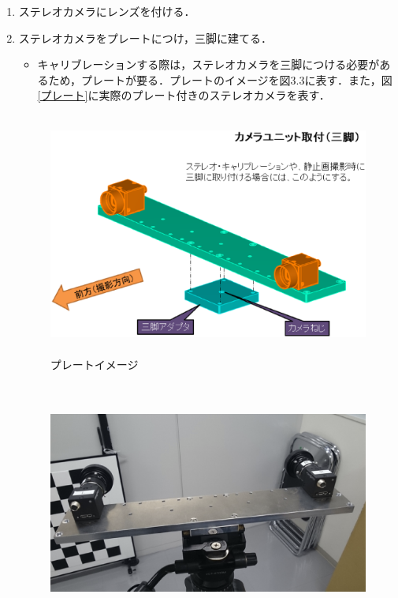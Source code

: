 \begin{enumerate}
 \item ステレオカメラにレンズを付ける．
 \item ステレオカメラをプレートにつけ，三脚に建てる．
 \begin{itemize}
      \item キャリブレーションする際は，ステレオカメラを三脚につける必要があるため，プレートが要る．プレートのイメージを図3.3に表す．また，図{\ref{プレート}}に実際のプレート付きのステレオカメラを表す．
 \end{itemize}

\begin{figure}[htbp]
  \begin{center}
   \includegraphics[height=80mm]{figure/プレートイメージ.eps}
   \caption{プレートイメージ}
   \label{プレートイメージ}
  \end{center}
\end{figure}
\begin{figure}[htbp]
  \begin{center}
   \includegraphics[height=80mm]{figure/プレート.eps}

\end{center}
\end{figure}
\end{enumerate}
